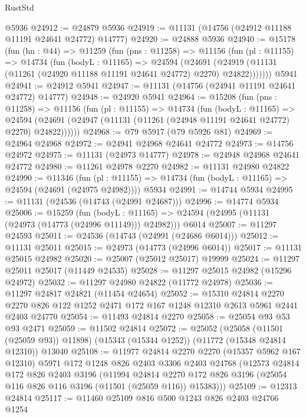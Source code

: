 \begin{lexlean}{RustStd}
\begin{coremodule}
    @5936
@24912 := @24879 @5936
@24919 := @11131 (@14756 (@24912 @11188 @11191 @24641 @24772) @14777)
@24920 := @24888 @5936
@24940 := @15178
    (fun (hn : @44) =>
    @11259
      (fun (pns : @11258) =>
      @11156
        (fun (pl : @11155) =>
        @14734
          (fun (bodyL : @11165) =>
          @24594
            (@24691
              (@24919 (@11131 (@11261 (@24920 @11188 @11191 @24641 @24772) @2270) @24822)))))))
    @5941
@24941 := @24912 @5941
@24947 := @11131 (@14756 (@24941 @11191 @24641 @24772) @14777)
@24948 := @24920 @5941
@24964 := @15208
    (fun (pns : @11258) =>
    @11156
      (fun (pl : @11155) =>
      @14734
        (fun (bodyL : @11165) =>
        @24594 (@24691 (@24947 (@11131 (@11261 (@24948 @11191 @24641 @24772) @2270) @24822))))))
@24968 := @79 @5917 (@79 @5926 @81)
@24969 := @24964 @24968
@24972 := @24941 @24968 @24641 @24772
@24973 := @14756 @24972
@24975 := @11131 (@24973 @14777)
@24978 := @24948 @24968 @24641 @24772
@24980 := @11261 @24978 @2270
@24982 := @11131 @24980 @24822
@24990 := @11346
    (fun (pl : @11155) => @14734 (fun (bodyL : @11165) => @24594 (@24691 (@24975 @24982))))
    @5934
@24991 := @14744 @5934
@24995 := @11131 (@24536 (@14743 (@24991 @24687)))
@24996 := @14774 @5934
@25006 := @15259
    (fun (bodyL : @11165) => @24594 (@24995 (@11131 (@24973 (@14773 (@24996 @11149))) @24982)))
    @6014
@25007 := @11297 @24593
@25011 := @24536 (@14743 (@24991 (@24686 @6014)))
@25012 := @11131 @25011
@25015 := @24973 (@14773 (@24996 @6014))
@25017 := @11131 @25015 @24982
@25020 := @25007 (@25012 @25017) @19999
@25024 := @11297 @25011 @25017 (@11449 @24535)
@25028 := @11297 @25015 @24982 (@15296 @24972)
@25032 := @11297 @24980 @24822 (@11772 @24978)
@25036 := @11297 @24817 @24821 (@11454 @24654)
@25052 := @15310
    @24814
    @2270
    @2270
    @826
    @122
    @1252
    @2471
    @172
    @167
    @1248
    @12310
    @2613
    @5961
    @2441
    @2403
    @24770
@25054 := @11493 @24814 @2270
@25058 := @25054 @93 @53 @93 @2471
@25059 := @11502 @24814
@25072 := @25052
    (@25058 (@11501 (@25059 @93)) @11898)
    (@15343 (@15344 @1252))
    (@11772 (@15348 @24814 @12310))
    @13040
@25108 := @11977
    @24814
    @2270
    @2270
    (@15357 @5962 @167 @12310)
    @5971
    @172
    @1248
    @826
    @2403
    @3306
    @2403
    @24768
    (@12573
      @24814
      @172
      @826
      @2403
      @3196
      (@11994
        @24814
        @2270
        @172
        @826
        @3196
        (@25054 @116 @826 @116 @3196 (@11501 (@25059 @116)) @15383)))
@25109 := @12313 @24814
@25117 := @11460 @25109 @816 @500 @1243 @826 @2403 @24766 @1254

\end{coremodule}
\end{lexlean}
